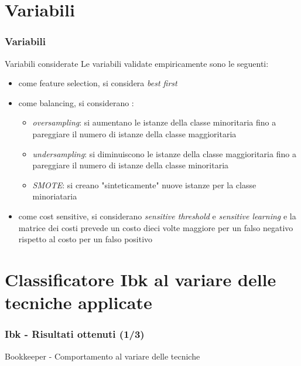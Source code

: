 \documentclass[
	usepdftitle=false,
	xcolor={table, dvipsnames},
	hyperref={
		pdftitle={Machine Learning per Software Engineering},
    	pdfauthor={Alessando Chillotti}
    }
]{beamer}
\begin{document}
\section{Variabili}
\begin{frame}
\frametitle{Variabili}
\begin{block}{Variabili considerate}
Le variabili validate empiricamente sono le seguenti:
\begin{itemize}
\item come feature selection, si considera \textit{best first}
\item come balancing, si considerano :
\begin{itemize}
\item \textit{oversampling}: si aumentano le istanze della classe minoritaria fino a pareggiare il numero di istanze della classe maggioritaria
\item \textit{undersampling}: si diminuiscono le istanze della classe maggioritaria fino a pareggiare il numero di istanze della classe minoritaria
\item \textit{SMOTE}: si creano "sinteticamente" nuove istanze per la classe minoriataria
\end{itemize}
\item come cost sensitive, si considerano \textit{sensitive threshold} e \textit{sensitive learning} e la matrice dei costi prevede un costo dieci volte maggiore per un falso negativo rispetto al costo per un falso positivo
\end{itemize}
\end{block}
\end{frame}

\section{Classificatore Ibk al variare delle tecniche applicate}
\begin{frame}
\frametitle{Ibk - Risultati ottenuti (1/3)}
\begin{block}{Bookkeeper - Comportamento al variare delle tecniche}
\begin{figure}[ht!]
\end{figure}
\end{block}
\end{frame}
\end{document}
